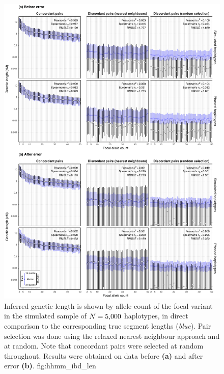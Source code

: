 

\begin{figure}[!htb]
\includegraphics[width=\textwidth]{./img/ch5/hhmm_ibd_len_lowres}
{Inferred genetic length is shown by allele count of the focal variant in the simulated sample of ${N=\n{5000}}$ haplotypes, in direct comparison to the corresponding true segment lengths (\emph{blue}).
Pair selection was done using the relaxed nearest neighbour approach and at random.
Note that concordant pairs were selected at random throughout.
Results were obtained on data before \textbf{(a)} and after error \textbf{(b)}.}
{fig:hhmm_ibd_len}
\end{figure}
